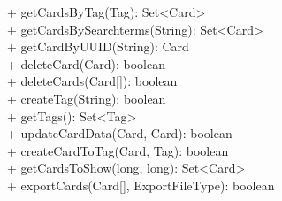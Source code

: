 {
    + getCardsByTag(Tag): Set<Card> \\
    + getCardsBySearchterms(String): Set<Card> \\
    + getCardByUUID(String): Card \\
    + deleteCard(Card): boolean \\
    + deleteCards(Card[]): boolean \\
    + createTag(String): boolean \\
    + getTags(): Set<Tag> \\
    + updateCardData(Card, Card): boolean \\
    + createCardToTag(Card, Tag): boolean \\
    + getCardsToShow(long, long): Set<Card> \\
    + exportCards(Card[], ExportFileType): boolean \\
}{}
